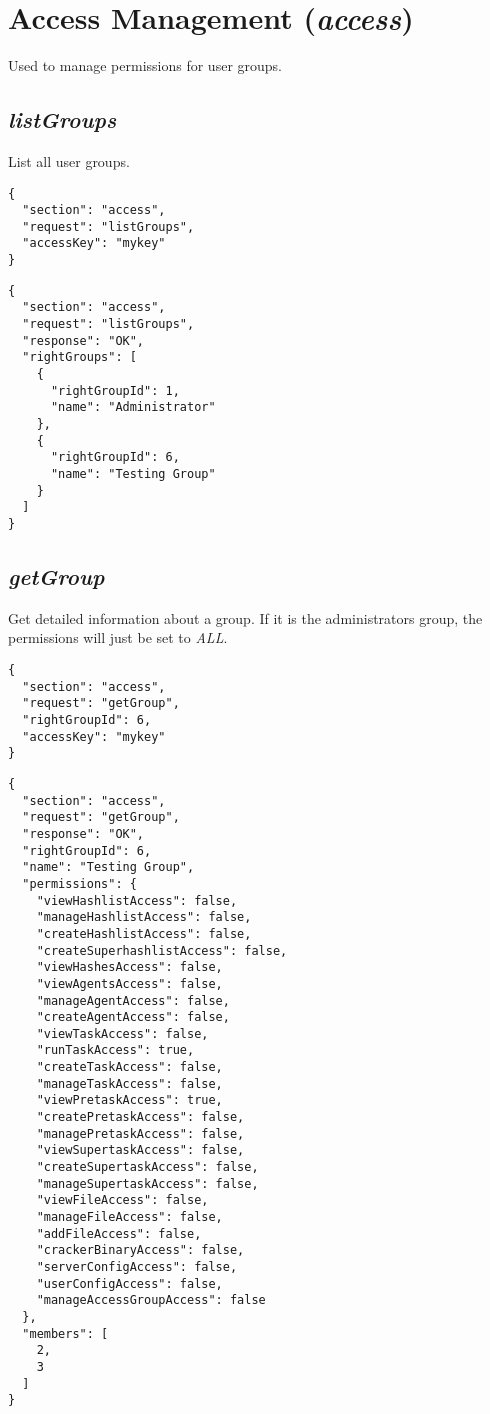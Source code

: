 \section*{Access Management (\textit{access})}
	Used to manage permissions for user groups.

\subsection*{\textit{listGroups}}
	List all user groups.
	{
		\color{blue}
		\begin{verbatim}
{
  "section": "access",
  "request": "listGroups",
  "accessKey": "mykey"
}
		\end{verbatim}
	}
	{
		\color{OliveGreen}
		\begin{verbatim}
{
  "section": "access",
  "request": "listGroups",
  "response": "OK",
  "rightGroups": [
    {
      "rightGroupId": 1,
      "name": "Administrator"
    },
    {
      "rightGroupId": 6,
      "name": "Testing Group"
    }
  ]
}
		\end{verbatim}
	}
\subsection*{\textit{getGroup}}
	Get detailed information about a group. If it is the administrators group, the permissions will just be set to \textit{ALL}.
	{
		\color{blue}
		\begin{verbatim}
{
  "section": "access",
  "request": "getGroup",
  "rightGroupId": 6,
  "accessKey": "mykey"
}
		\end{verbatim}
	}
	{
		\color{OliveGreen}
		\begin{verbatim}
{
  "section": "access",
  "request": "getGroup",
  "response": "OK",
  "rightGroupId": 6,
  "name": "Testing Group",
  "permissions": {
    "viewHashlistAccess": false,
    "manageHashlistAccess": false,
    "createHashlistAccess": false,
    "createSuperhashlistAccess": false,
    "viewHashesAccess": false,
    "viewAgentsAccess": false,
    "manageAgentAccess": false,
    "createAgentAccess": false,
    "viewTaskAccess": false,
    "runTaskAccess": true,
    "createTaskAccess": false,
    "manageTaskAccess": false,
    "viewPretaskAccess": true,
    "createPretaskAccess": false,
    "managePretaskAccess": false,
    "viewSupertaskAccess": false,
    "createSupertaskAccess": false,
    "manageSupertaskAccess": false,
    "viewFileAccess": false,
    "manageFileAccess": false,
    "addFileAccess": false,
    "crackerBinaryAccess": false,
    "serverConfigAccess": false,
    "userConfigAccess": false,
	"manageAccessGroupAccess": false
  },
  "members": [
    2,
    3
  ]
}
		\end{verbatim}
	}
